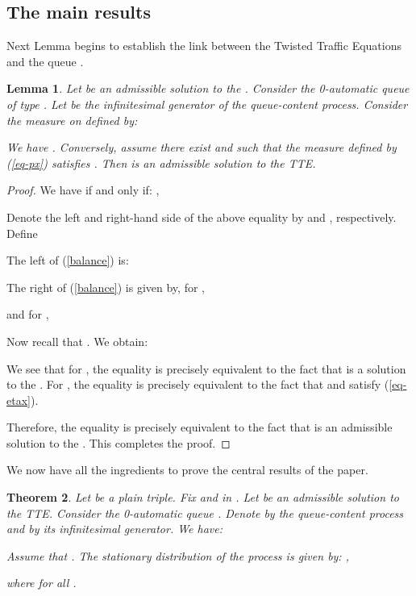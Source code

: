 \documentclass[11pt,a4paper]{article}
\newtheorem{theorem}{Theorem}[section]
\newtheorem{lemma}[theorem]{Lemma}
\theoremstyle{remark}
\def\eref#1{(\ref{#1})}
\begin{document}
\subsection{The main results}\label{sse-main}

Next Lemma begins
to establish the link between the
Twisted Traffic Equations and the queue .

\begin{lemma}\label{lemma2}
Let  be an admissible solution to the
. Consider the 0-automatic queue of type
. Let  be the infinitesimal generator
of the queue-content process.
Consider the measure  on  defined by:

We have . Conversely, assume there exist
 and  such that the measure 
defined by \eref{eq-px} satisfies . Then
 is an admissible solution to the TTE.
\end{lemma}

\begin{proof}
We have  if and only if: ,

Denote the left and right-hand side of the above equality by 
and , respectively. Define

The left of (\ref{balance}) is:


The right of (\ref{balance}) is given by, for ,

and for ,

Now recall that  .
We obtain:


We see that for , the equality  is
precisely equivalent to the fact that  is a solution to
the . For , the equality  is
precisely equivalent to the fact that  and  satisfy
\eref{eq-etax}.

Therefore, the equality  is precisely equivalent to the fact
that  is an admissible solution to the .
This completes the proof.
\end{proof}


We now have all the
ingredients to prove the central results of the
paper.


\begin{theorem}\label{th-main}
Let  be a plain triple. Fix  and
 in .
Let  be an admissible solution to the TTE.
Consider the 0-automatic queue
  .  Denote by  the
  queue-content process and by  its infinitesimal generator.
We have:

Assume that . The stationary
distribution  of the process  is given by:
,

where  for all .
\end{theorem}
\end{document}
